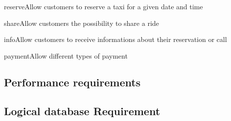 \begin{Goal}{reserve}{Allow customers to reserve a taxi for a given date and time}{
}
\end{Goal}

\begin{Goal}{share}{Allow customers the possibility to share a ride}{
}
\end{Goal}

\begin{Goal}{info}{Allow customers to receive informations about their reservation or call}{
}
\end{Goal}

\begin{Goal}{payment}{Allow different types of payment}{
}
\end{Goal}


%
\subsection{Performance requirements}
\subsection{Logical database Requirement}


